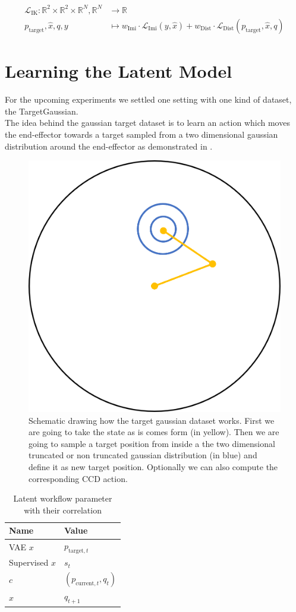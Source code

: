 \begin{equation}\label{eqn:IK-Loss}
    \begin{split}
        \mathcal{L}_\text{IK}: \mathbb{R}^2 \times \mathbb{R}^2 \times \mathbb{R}^N, \mathbb{R}^N & \to \mathbb{R} \\
        p_\text{target}, \hat{x}, q, y  &\mapsto w_\text{Imi} \cdot \mathcal{L}_\text{Imi}(y, \hat{x}) + w_\text{Dist} \cdot \mathcal{L}_\text{Dist}(p_\text{target}, \hat{x}, q)
    \end{split}
\end{equation}

\section{Learning the Latent Model}

For the upcoming experiments we settled one setting with one kind of dataset, the TargetGaussian. \\
The idea behind the gaussian target dataset is to learn an action which moves the end-effector towards a target sampled from a two dimensional gaussian distribution around the end-effector as demonstrated in .
\begin{figure}
    \begin{center}
        \includegraphics[width=0.3 \linewidth]{figures/experiments/VAE/TargetGaussian.png}
    \end{center}
    \caption[Target Gaussian Schematics]{Schematic drawing how the target gaussian dataset works. First we are going to take the state as is comes form  (in yellow). Then we are going to sample a target position from inside a the two dimensional truncated or non truncated gaussian distribution (in blue) and define it as new target position. Optionally we can also compute the corresponding CCD action.}\label{fig:TargetGaussian_Schematics}
\end{figure}

\begin{table}[]
    \centering
    \begin{tabular}{l|l}
        Name & Value \\
        \hline
        VAE $x$ & $p_{\text{target}, t}$ \\
        Supervised $x$ & $s_t$ \\
        $c$ & $(p_{\text{current}, t}, q_t)$ \\
        $\hat{x}$ & $q_{t + 1}$
    \end{tabular}
    \caption[Latent workflow parameter]{Latent workflow parameter with their correlation}
    \label{tab:Latent Parameter}
\end{table}

